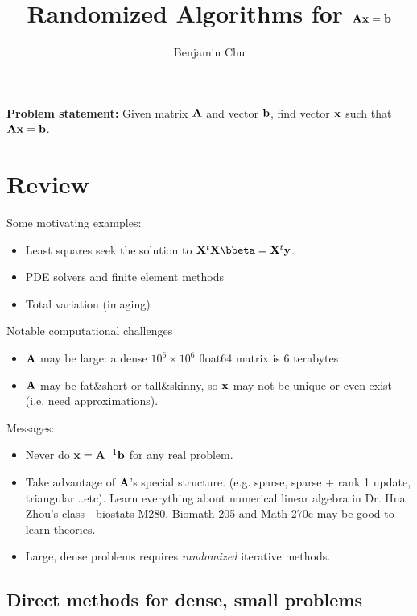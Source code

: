 \documentclass[./some_latex_template.tex]{subfiles}
\begin{document}
\title{Randomized Algorithms for $\mathbf{A}\mathbf{x} = \mathbf{b}$}
\author{Benjamin Chu}
\maketitle

\textbf{Problem statement:} Given matrix $\mathbf{A}$ and vector $\mathbf{b}$, find vector $\mathbf{x}$ such that $\mathbf{A} \mathbf{x} = \mathbf{b}$.

\section{Review}

\noindent Some motivating examples:

\begin{itemize}
	\item Least squares seek the solution to $\bX^t\bX \bbeta = \bX^t \by$. 
	\item PDE solvers and finite element methods
	\item Total variation (imaging)
\end{itemize}

\noindent Notable computational challenges

\begin{itemize}
	\item $\mathbf{A}$ may be large: a dense $10^6 \times 10^6$ float64 matrix is 6 terabytes
	\item $\mathbf{A}$ may be fat\&short or tall\&skinny, so $\mathbf{x}$ may not be unique or even exist (i.e. need approximations). 
\end{itemize}

\noindent Messages:
 
\begin{itemize}
	\item Never do $\mathbf{x} = \mathbf{A}^{-1}\mathbf{b}$ for any real problem.
	\item Take advantage of $\mathbf{A}$'s special structure. (e.g. sparse, sparse + rank 1 update, triangular...etc). Learn everything about numerical linear algebra in Dr. Hua Zhou's class -  biostats M280. Biomath 205 and Math 270c may be good to learn theories. 
	\item Large, dense problems requires \textit{randomized} iterative methods. 
\end{itemize}

\subsection{Direct methods for dense, small problems}
\end{document}
